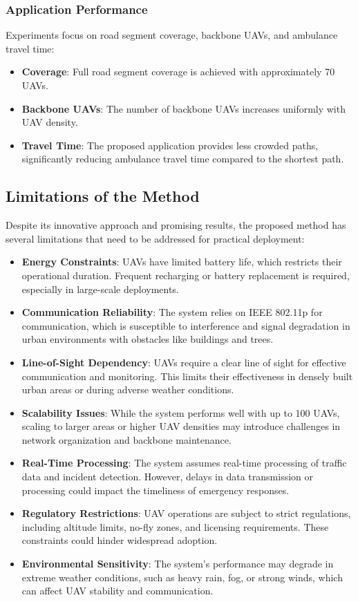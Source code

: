 \subsubsection{Application Performance}
Experiments focus on road segment coverage, backbone UAVs, and ambulance travel time:
\begin{itemize}
    \item \textbf{Coverage}: Full road segment coverage is achieved with approximately 70 UAVs.
    \item \textbf{Backbone UAVs}: The number of backbone UAVs increases uniformly with UAV density.
    \item \textbf{Travel Time}: The proposed application provides less crowded paths, significantly reducing ambulance travel time compared to the shortest path.
\end{itemize}

\vspace{\baselineskip} %

\subsection{Limitations of the Method}
Despite its innovative approach and promising results, the proposed method has several limitations that need to be addressed for practical deployment:
\begin{itemize}
    \item \textbf{Energy Constraints}: UAVs have limited battery life, which restricts their operational duration. Frequent recharging or battery replacement is required, especially in large-scale deployments.
    \item \textbf{Communication Reliability}: The system relies on IEEE 802.11p for communication, which is susceptible to interference and signal degradation in urban environments with obstacles like buildings and trees.
    \item \textbf{Line-of-Sight Dependency}: UAVs require a clear line of sight for effective communication and monitoring. This limits their effectiveness in densely built urban areas or during adverse weather conditions.
    \item \textbf{Scalability Issues}: While the system performs well with up to 100 UAVs, scaling to larger areas or higher UAV densities may introduce challenges in network organization and backbone maintenance.
    \item \textbf{Real-Time Processing}: The system assumes real-time processing of traffic data and incident detection. However, delays in data transmission or processing could impact the timeliness of emergency responses.
    \item \textbf{Regulatory Restrictions}: UAV operations are subject to strict regulations, including altitude limits, no-fly zones, and licensing requirements. These constraints could hinder widespread adoption.
    \item \textbf{Environmental Sensitivity}: The system's performance may degrade in extreme weather conditions, such as heavy rain, fog, or strong winds, which can affect UAV stability and communication.
\end{itemize}

